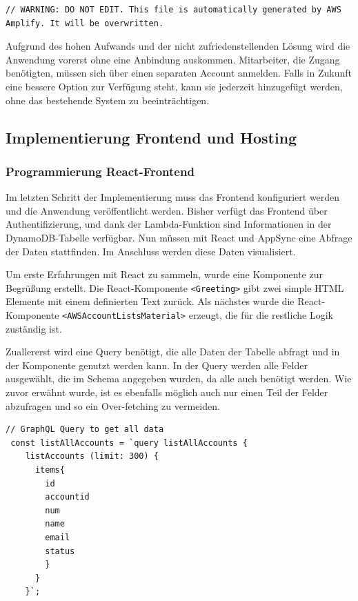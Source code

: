 \begin{lstlisting}[basicstyle=\ttfamily\small, breaklines=true , frame = single, backgroundcolor=\color{flashwhite}, caption={Auszug aws-exports.js} ]
// WARNING: DO NOT EDIT. This file is automatically generated by AWS Amplify. It will be overwritten.
\end{lstlisting}

Aufgrund des hohen Aufwands und der nicht zufriedenstellenden Lösung wird die Anwendung vorerst ohne eine Anbindung auskommen.
Mitarbeiter, die Zugang benötigten, müssen sich über einen separaten Account anmelden.
Falls in Zukunft eine bessere Option zur Verfügung steht, kann sie jederzeit hinzugefügt werden, ohne das bestehende System zu beeinträchtigen.


\subsection{Implementierung Frontend und Hosting}

\subsubsection{Programmierung React-Frontend}
\label{ReactFrontend}
Im letzten Schritt der Implementierung muss das Frontend konfiguriert werden und die Anwendung veröffentlicht werden.
Bisher verfügt das Frontend über Authentifizierung, und dank der Lambda-Funktion sind Informationen in der DynamoDB-Tabelle verfügbar.
Nun müssen mit React und AppSync eine Abfrage der Daten stattfinden.
Im Anschluss werden diese Daten visualisiert.

Um erste Erfahrungen mit React zu sammeln, wurde eine Komponente zur Begrüßung erstellt.
Die React-Komponente \verb+<Greeting>+ gibt zwei simple HTML Elemente mit einem definierten Text zurück.
Als nächstes wurde die React-Komponente \verb+<AWSAccountListsMaterial>+ erzeugt, die für die restliche Logik zuständig ist.

Zuallererst wird eine Query benötigt, die alle Daten der Tabelle abfragt und in der Komponente genutzt werden kann.
In der Query werden alle Felder ausgewählt, die im Schema angegeben wurden, da alle auch benötigt werden.
Wie zuvor erwähnt wurde, ist es ebenfalls möglich auch nur einen Teil der Felder abzufragen und so ein Over-fetching zu vermeiden.
\\
\begin{lstlisting}[basicstyle=\ttfamily\small, breaklines=true , frame = single, backgroundcolor=\color{flashwhite} ]
// GraphQL Query to get all data
 const listAllAccounts = `query listAllAccounts {
    listAccounts (limit: 300) {
      items{
        id
        accountid
        num
        name
        email
        status
        }
      }
    }`;
    \end{lstlisting}



